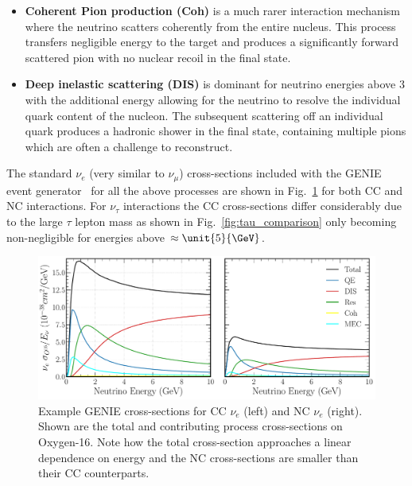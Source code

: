 \begin{itemize}
    \item \textbf{Coherent Pion production (Coh)} is a much rarer interaction mechanism where the
          neutrino scatters coherently from the entire nucleus. This process transfers negligible
          energy to the target and produces a significantly forward scattered pion with no nuclear
          recoil in the final state.

    \item \textbf{Deep inelastic scattering (DIS)} is dominant for neutrino energies above
          \unit{3}{\GeV} with the additional energy allowing for the neutrino to resolve the
          individual quark content of the nucleon. The subsequent scattering off an individual
          quark produces a hadronic shower in the final state, containing multiple pions which are
          often a challenge to reconstruct.
\end{itemize}

The standard $\nu_{e}$ (very similar to $\nu_{\mu}$) cross-sections included with the GENIE event
generator~\cite{andreopoulos2009, andreopoulos2015} for all the above processes are shown in
Fig.~\ref{fig:xsec_nu_e_O16} for both CC and NC interactions. For $\nu_{\tau}$ interactions the CC
cross-sections differ considerably due to the large $\tau$ lepton mass as shown in
Fig.~\ref{fig:tau_comparison} only becoming non-negligible for energies above
$\approx\unit{5}{\GeV}$.

\begin{figure} %
    \includegraphics[width=\textwidth]{diagrams/3-theory/xsec_nu_e_O16.pdf}
    \caption[$\nu_{e}$ GENIE cross-sections on Oxygen-16.]
    {Example GENIE cross-sections for CC $\nu_{e}$ (left) and NC $\nu_{e}$ (right). Shown are the
        total and contributing process cross-sections on Oxygen-16. Note how the total
        cross-section approaches a linear dependence on energy and the NC cross-sections are
        smaller than their CC counterparts.}
    \label{fig:xsec_nu_e_O16}
\end{figure}

